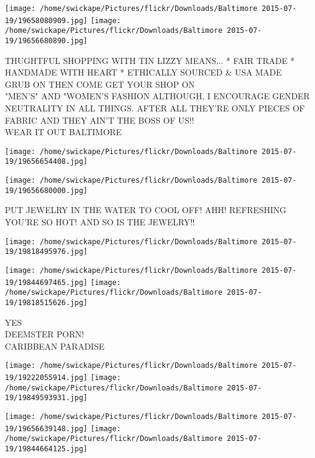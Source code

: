 \documentclass[10pt,letterpaper]{article}
\begin{document}
\texttt{[image: /home/swickape/Pictures/flickr/Downloads/Baltimore 2015-07-19/19658080909.jpg]}
\texttt{[image: /home/swickape/Pictures/flickr/Downloads/Baltimore 2015-07-19/19656680890.jpg]}

THUGHTFUL SHOPPING WITH TIN LIZZY MEANS... * FAIR TRADE * HANDMADE WITH HEART * ETHICALLY SOURCED \& USA MADE\\
GRUB ON THEN COME GET YOUR SHOP ON\\
"MEN'S" AND "WOMEN'S  FASHION ALTHOUGH, I ENCOURAGE GENDER NEUTRALITY IN ALL THINGS.  AFTER ALL THEY'RE ONLY PIECES OF FABRIC AND THEY AIN'T THE BOSS OF US!!\\
WEAR IT OUT BALTIMORE\\
\pagebreak

\texttt{[image: /home/swickape/Pictures/flickr/Downloads/Baltimore 2015-07-19/19656654408.jpg]}

\vspace{0.25in}
\texttt{[image: /home/swickape/Pictures/flickr/Downloads/Baltimore 2015-07-19/19656680000.jpg]}

PUT JEWELRY IN THE WATER TO COOL OFF!  AHH!  REFRESHING\\
YOU'RE SO HOT!  AND SO IS THE JEWELRY!!\\
\pagebreak

\texttt{[image: /home/swickape/Pictures/flickr/Downloads/Baltimore 2015-07-19/19818495976.jpg]}

\vspace{0.25in}
\texttt{[image: /home/swickape/Pictures/flickr/Downloads/Baltimore 2015-07-19/19844697465.jpg]}
\texttt{[image: /home/swickape/Pictures/flickr/Downloads/Baltimore 2015-07-19/19818515626.jpg]}

YES\\
DEEMSTER PORN!\\
CARIBBEAN PARADISE\\
\pagebreak

\texttt{[image: /home/swickape/Pictures/flickr/Downloads/Baltimore 2015-07-19/19222055914.jpg]}
\texttt{[image: /home/swickape/Pictures/flickr/Downloads/Baltimore 2015-07-19/19849593931.jpg]}

\texttt{[image: /home/swickape/Pictures/flickr/Downloads/Baltimore 2015-07-19/19656639148.jpg]}
\texttt{[image: /home/swickape/Pictures/flickr/Downloads/Baltimore 2015-07-19/19844664125.jpg]}
\end{document}
